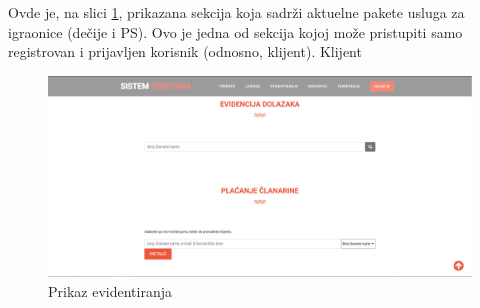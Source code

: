 \documentclass[../main.tex]{subfiles}
\begin{document}
Ovde je, na slici \ref{fig:igraonice}, prikazana sekcija koja sadrži aktuelne pakete usluga za igraonice (dečije i PS). Ovo je jedna od sekcija kojoj može pristupiti samo registrovan i prijavljen korisnik (odnosno, klijent). Klijent 

\begin{figure}[!ht]
\begin{center}
\includegraphics[scale=0.35]{sections/korisnicki_interfejs/screenshots/evidentiranja.PNG}
\end{center}
\caption{Prikaz evidentiranja}
\label{fig:igraonice}
\end{figure}
\end{document}
